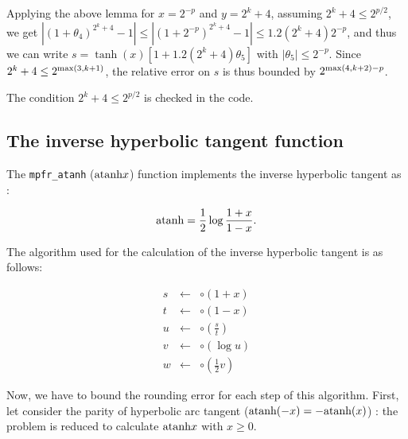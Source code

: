 \documentclass[12pt]{amsart}
\def\n{\textnormal}
\begin{document}
Applying the above lemma for $x=2^{-p}$ and $y=2^k+4$,
assuming $2^k+4 \leq 2^{p/2}$,
we get $|(1+\theta_4)^{2^k+4} - 1| \leq |(1+2^{-p})^{2^k+4} - 1|
\leq 1.2 (2^k+4) 2^{-p}$, and thus
we can write $s = \tanh(x) [1 + 1.2 (2^k+4)\theta_5]$ with
$|\theta_5| \leq 2^{-p}$.
Since $2^k+4 \leq 2^{{\rm max}(3,k+1)}$,
the relative error on $s$ is thus bounded by $2^{{\rm max}(4,k+2)-p}$.

The condition $2^k+4 \leq 2^{p/2}$ is checked in the code.

\subsection{The inverse hyperbolic tangent function}

The {\tt mpfr\_atanh} ($\n{atanh}{x}$) function implements the inverse
hyperbolic tangent as :

\[\n{atanh} = \frac{1}{2} \log \frac{1+x}{1-x}.\]

The algorithm used for the calculation of the inverse hyperbolic tangent is
as follows:

\begin{eqnarray}\nonumber
s&\leftarrow&\circ(1+x)\\\nonumber
t&\leftarrow&\circ(1-x)\\\nonumber
u&\leftarrow&\circ(\frac{s}{t})\\\nonumber
v&\leftarrow&\circ(\log u)\\\nonumber
w&\leftarrow&\circ(\frac{1}{2} v)
\end{eqnarray}


Now, we have to bound the rounding error for each step of this
algorithm. First, let consider the parity of hyperbolic arc tangent
($\n{atanh}(-x)=-\n{atanh}(x)$) : the problem is reduced to calculate
$\n{atanh} x$ with $x \geq 0$.
\end{document}
